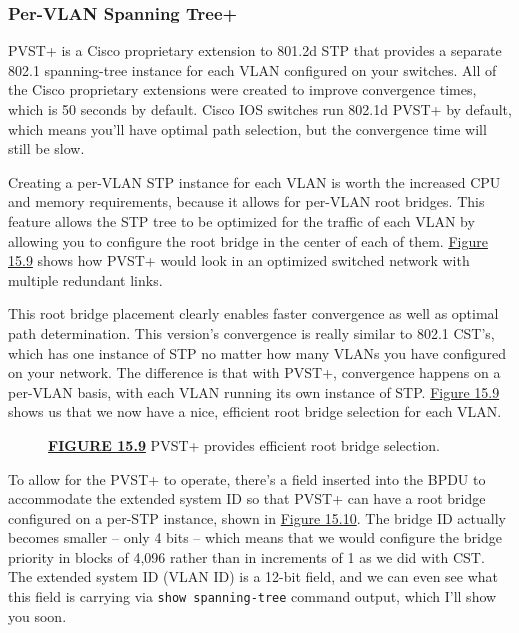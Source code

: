 \subsubsection[Per-VLAN Spanning
Tree+]{\texorpdfstring{\protect\hypertarget{c15.xhtmlux5cux23c15-sec-14}{}{}Per-VLAN
Spanning Tree+}{Per-VLAN Spanning Tree+}}

PVST+ is a Cisco proprietary extension to 801.2d STP that provides a
separate 802.1 spanning-tree instance for each VLAN configured on your
switches. All of the Cisco proprietary extensions were created to
improve convergence times, which is 50 seconds by default. Cisco IOS
switches run 802.1d PVST+ by default, which means you'll have optimal
path selection, but the convergence time will still be slow.

Creating a per-VLAN STP instance for each VLAN is worth the increased
CPU and memory requirements, because it allows for per-VLAN root
bridges. This feature allows the STP tree to be optimized for the
traffic of each VLAN by allowing you to configure the root bridge in the
center of each of them.
\protect\hyperlink{c15.xhtmlux5cux23figure15-9}{Figure 15.9} shows how
PVST+ would look in an optimized switched network with multiple
redundant links.

This root bridge placement clearly enables faster convergence as well as
optimal path determination. This version's convergence is really similar
to 802.1 CST's, which has one instance of STP no matter how many VLANs
you have configured on your network. The difference is that with PVST+,
convergence happens on a per-VLAN basis, with each VLAN running its own
instance of STP. \protect\hyperlink{c15.xhtmlux5cux23figure15-9}{Figure
15.9} shows us that we now have a nice, efficient root bridge selection
for each VLAN.



\begin{figure}
\centering
\caption{{\protect\hyperlink{c15.xhtmlux5cux23figureanchor15-9}{\textbf{FIGURE
15.9}} PVST+ provides efficient root bridge selection.}}
\end{figure}

To allow for the PVST+ to operate, there's a field inserted into the
BPDU to accommodate the extended system ID so that PVST+ can have a root
bridge configured on a per-STP instance, shown in
\protect\hyperlink{c15.xhtmlux5cux23figure15-10}{Figure 15.10}. The
bridge ID actually becomes smaller -- only 4 bits -- which means that we
would configure the bridge priority in blocks of 4,096 rather than in
increments of 1 as we did with CST. The extended system ID (VLAN ID) is
a 12-bit field, and we can even see what this field is carrying via
\texttt{show\ spanning-tree} command output, which I'll show you soon.

